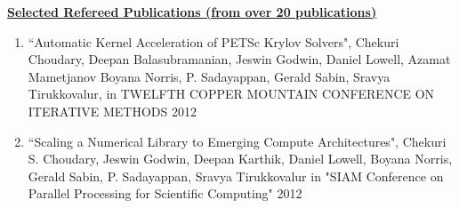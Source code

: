  {\bf {\underline{Selected Refereed Publications (from over 20 publications)}}}
 \begin{enumerate}
 	\setlength{\itemsep}{0.2pt}
 	
 	
 	\item ``Automatic Kernel Acceleration of PETSc Krylov Solvers",
 	Chekuri Choudary, Deepan Balasubramanian, Jeswin Godwin, Daniel
 	Lowell, Azamat Mametjanov Boyana Norris, P. Sadayappan, Gerald
 	Sabin, Sravya Tirukkovalur, in TWELFTH COPPER MOUNTAIN CONFERENCE ON
 	ITERATIVE METHODS 2012
 	
 	
 	
 	
 	\item ``Scaling a Numerical Library to Emerging Compute
 	Architectures", Chekuri S. Choudary, Jeswin Godwin, Deepan Karthik,
 	Daniel Lowell, Boyana Norris, Gerald Sabin, P. Sadayappan, Sravya
 	Tirukkovalur in "SIAM Conference on Parallel Processing for
 	Scientific Computing" 2012
 	
 	
 	

\end{enumerate}
